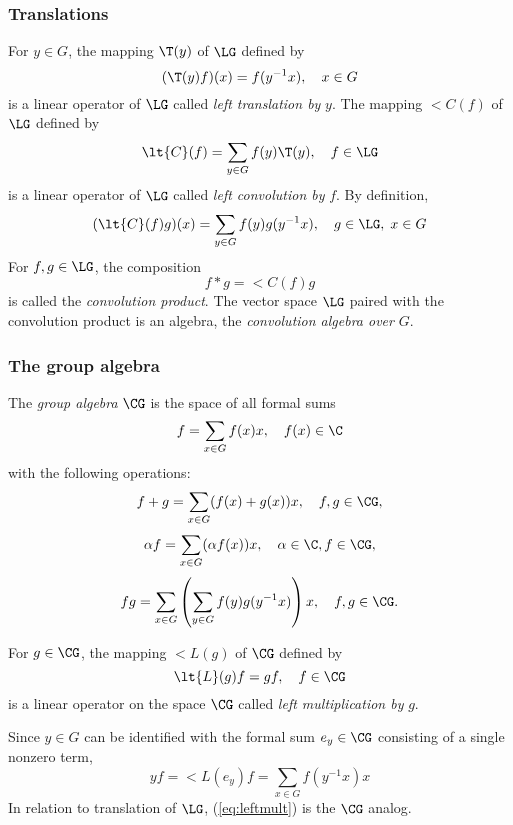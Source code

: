 \subsubsection{Translations}
For $y\in G$, the mapping $\T(y)$ of $\LG$ defined by 
\[
(\T(y)f)(x) = f(y^{-1}x), \quad x \in G
\]
is a linear operator of $\LG$ called 
\emph{left translation by} $y$.
The mapping $\lt{C}(f)$ of $\LG$ defined by 
\[
\lt{C}(f) = \sum_{y\in G} f(y) \T(y), \quad f\in \LG
\]
is a linear operator of $\LG$ called 
\emph{left convolution by} $f$.  By definition, 
\[
(\lt{C}(f)g)(x) = \sum_{y\in G} f(y) g(y^{-1}x), \quad g \in \LG,\; x\in G
\]
For $f, g \in \LG$, the composition
\[
f * g  = \lt{C}(f)g
\]
is called the \emph{convolution product}.
The vector space $\LG$ paired with the convolution product
is an algebra, the \emph{convolution algebra over} $G$.

\subsubsection{The group algebra}
\label{sec:groupalgebraA}
The \emph{group algebra} $\CG$ is the space of all formal sums
\[
f = \sum_{x\in G} f(x) x, \quad f(x) \in \C
\]
with the following operations:
\[
f+g = \sum_{x\in G} (f(x) + g(x))x, \quad f, g \in \CG,
\]
\[
\alpha f = \sum_{x\in G} (\alpha f(x)) x, \quad \alpha \in \C, f \in \CG,
\]
\[ %
fg = \sum_{x\in G}\left(\sum_{y\in G} f(y)g(y^{-1}x)\right)x, \quad f, g \in \CG.
\] %

For $g\in \CG$, the mapping $\lt{L}(g)$ of $\CG$ defined by 
\[
\lt{L}(g)f = gf, \quad f\in \CG
\]
is a linear operator on the space $\CG$ called 
\emph{left multiplication by} $g$.  

Since $y\in G$ can be identified with the formal
sum $e_y \in \CG$ consisting of a single nonzero term,
\begin{equation}\label{eq:leftmult}
yf = \lt{L}(e_y)f = \sum_{x\in G}f(y^{-1}x) x
\end{equation}
In relation to translation of $\LG$, (\ref{eq:leftmult}) is the
$\CG$ analog. 

